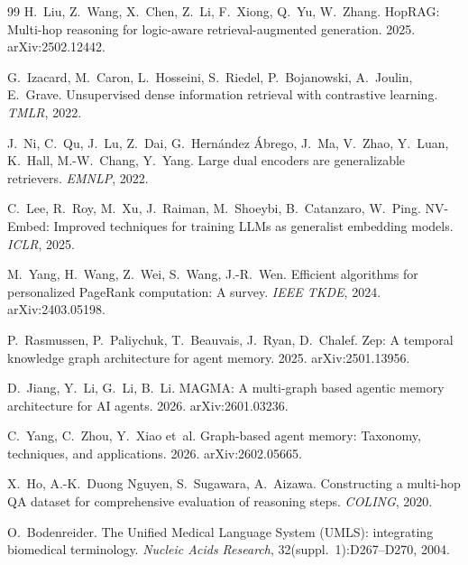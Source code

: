 \documentclass[11pt,a4paper]{article}
\begin{document}
\begin{thebibliography}{99}
 H.~Liu, Z.~Wang, X.~Chen, Z.~Li, F.~Xiong, Q.~Yu,
W.~Zhang. HopRAG: Multi-hop reasoning for logic-aware retrieval-augmented
generation. 2025. arXiv:2502.12442.

 G.~Izacard, M.~Caron, L.~Hosseini, S.~Riedel,
P.~Bojanowski, A.~Joulin, E.~Grave. Unsupervised dense information
retrieval with contrastive learning. \emph{TMLR}, 2022.

 J.~Ni, C.~Qu, J.~Lu, Z.~Dai, G.~Hernández Ábrego, J.~Ma,
V.~Zhao, Y.~Luan, K.~Hall, M.-W.~Chang, Y.~Yang. Large dual encoders are
generalizable retrievers. \emph{EMNLP}, 2022.

 C.~Lee, R.~Roy, M.~Xu, J.~Raiman, M.~Shoeybi,
B.~Catanzaro, W.~Ping. NV-Embed: Improved techniques for training LLMs as
generalist embedding models. \emph{ICLR}, 2025.

 M.~Yang, H.~Wang, Z.~Wei, S.~Wang, J.-R.~Wen.
Efficient algorithms for personalized PageRank computation: A survey.
\emph{IEEE TKDE}, 2024. arXiv:2403.05198.

 P.~Rasmussen, P.~Paliychuk, T.~Beauvais, J.~Ryan,
D.~Chalef. Zep: A temporal knowledge graph architecture for agent memory.
2025. arXiv:2501.13956.

 D.~Jiang, Y.~Li, G.~Li, B.~Li. MAGMA: A multi-graph based
agentic memory architecture for AI agents. 2026. arXiv:2601.03236.

 C.~Yang, C.~Zhou, Y.~Xiao et~al. Graph-based agent
memory: Taxonomy, techniques, and applications. 2026. arXiv:2602.05665.

 X.~Ho, A.-K.~Duong Nguyen, S.~Sugawara, A.~Aizawa.
Constructing a multi-hop QA dataset for comprehensive evaluation of
reasoning steps. \emph{COLING}, 2020.

 O.~Bodenreider. The Unified Medical Language System (UMLS):
integrating biomedical terminology. \emph{Nucleic Acids Research},
32(suppl.~1):D267--D270, 2004.

\end{thebibliography}
\end{document}
